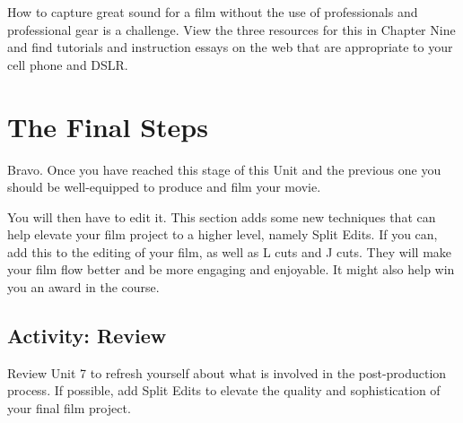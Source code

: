 \documentclass[
  letterpaper,
  DIV=11,
  numbers=noendperiod]{scrreprt}
\begin{document}
\begin{tcolorbox}[enhanced jigsaw, titlerule=0mm, opacitybacktitle=0.6, left=2mm, title={Learning Activity}, coltitle=black, colbacktitle=quarto-callout-note-color!10!white, toptitle=1mm, bottomtitle=1mm, colframe=quarto-callout-note-color-frame, colback=white, arc=.35mm, rightrule=.15mm, bottomrule=.15mm, toprule=.15mm, opacityback=0, breakable, leftrule=.75mm]

How to capture great sound for a film without the use of professionals
and professional gear is a challenge. View the three resources for this
in Chapter Nine and find tutorials and instruction essays on the web
that are appropriate to your cell phone and DSLR.

\end{tcolorbox}

\section{The Final Steps}\label{the-final-steps}

Bravo. Once you have reached this stage of this Unit and the previous
one you should be well-equipped to produce and film your movie.

You will then have to edit it. This section adds some new techniques
that can help elevate your film project to a higher level, namely Split
Edits. If you can, add this to the editing of your film, as well as L
cuts and J cuts. They will make your film flow better and be more
engaging and enjoyable. It might also help win you an award in the
course.

\subsection{Activity: Review}\label{activity-review}

\begin{tcolorbox}[enhanced jigsaw, titlerule=0mm, opacitybacktitle=0.6, left=2mm, title={Learning Activity}, coltitle=black, colbacktitle=quarto-callout-note-color!10!white, toptitle=1mm, bottomtitle=1mm, colframe=quarto-callout-note-color-frame, colback=white, arc=.35mm, rightrule=.15mm, bottomrule=.15mm, toprule=.15mm, opacityback=0, breakable, leftrule=.75mm]

Review Unit 7 to refresh yourself about what is involved in the
post-production process. If possible, add Split Edits to elevate the
quality and sophistication of your final film project.

\end{tcolorbox}
\end{document}
